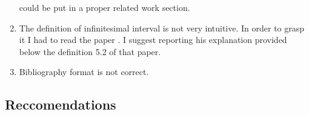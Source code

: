 \begin{enumerate}
could be put in a proper related work section.
\\
\item The definition of infinitesimal interval is not very intuitive. In order to
grasp it I had to read the paper \citep{jacobs2021paradoxes}. I suggest reporting his explanation provided below the definition 5.2 of that paper.
\\
\item Bibliography format is not correct.



\end{enumerate}



\subsection{Reccomendations}

